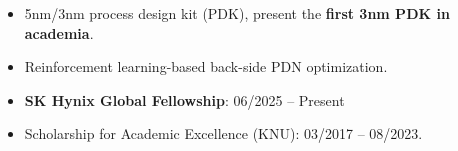 \begin{itemize}
    \item 5nm/3nm process design kit (PDK), present the \textbf{first 3nm PDK in academia}.
    \item Reinforcement learning-based back-side PDN optimization. 
\end{itemize}


\begin{itemize}
\item \textbf{SK Hynix Global Fellowship}: 06/2025 -- Present
\item Scholarship for Academic Excellence (KNU): 03/2017 -- 08/2023.
\end{itemize}

